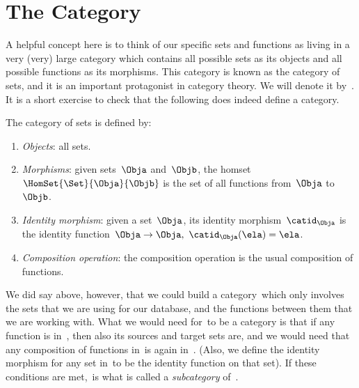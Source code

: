 
\section{The Category \Set}

A helpful concept here is to think of our specific sets and functions as living in a very (very) large category which contains all possible sets as its objects and all possible functions as its morphisms.
This category is known as the category of sets, and it is an important protagonist in category theory.
We will denote it by~\Set.
It is a short exercise to check that the following does indeed define a category.

\begin{ctdefinition}
    \label{def:Set}
    The category of sets \iindex{\Set} is defined by:
    \begin{enumerate}
        \item \emph{Objects}: all sets.
        \item \emph{Morphisms}: given sets~$\Obja$ and~$\Objb$, the homset~$\HomSet{\Set}{\Obja}{\Objb}$ is the set of all functions from~$\Obja$ to~$\Objb$.
        \item \emph{Identity morphism}: given a set~$\Obja$, its identity morphism~$\catid_\Obja$ is the identity function~$\Obja \to \Obja, \ \catid_\Obja(\ela) = \ela$.
        \item \emph{Composition operation}: the composition operation is the usual composition of functions.
    \end{enumerate}
\end{ctdefinition}

We did say above, however, that we could build a category~\Database which only involves the sets that we are using for our database, and the functions between them that we are working with.
What we would need for~\Database to be a category is that if any function is in~\Database, then also its sources and target sets are, and we would need that any composition of functions in~\Database is again in~\Database.
(Also, we define the identity morphism for any set in~\Database to be the identity function on that set).
If these conditions are met,~\Database is what is called a \emph{subcategory} of~\Set.
